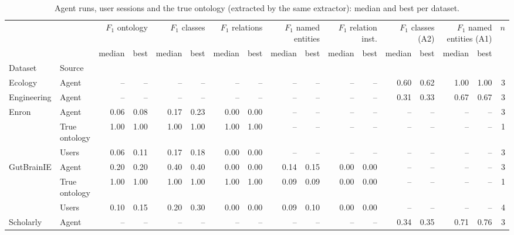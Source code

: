 \begin{table}
\caption{Agent runs, user sessions and the true ontology (extracted by the same extractor): median and best per dataset.}
\label{tab:onto_overview}
\begin{tabular}{llrrrrrrrrrrrrrrr}
\toprule
 &  & \multicolumn{2}{r}{$F_{1}$ ontology} & \multicolumn{2}{r}{$F_{1}$ classes} & \multicolumn{2}{r}{$F_{1}$ relations} & \multicolumn{2}{r}{$F_{1}$ named entities} & \multicolumn{2}{r}{$F_{1}$ relation inst.} & \multicolumn{2}{r}{$F_{1}$ classes (A2)} & \multicolumn{2}{r}{$F_{1}$ named entities (A1)} & $n$ \\
 &  & median & best & median & best & median & best & median & best & median & best & median & best & median & best &  \\
Dataset & Source &  &  &  &  &  &  &  &  &  &  &  &  &  &  &  \\
\midrule
Ecology & Agent & -- & -- & -- & -- & -- & -- & -- & -- & -- & -- & 0.60 & 0.62 & 1.00 & 1.00 & 3 \\
\cline{1-17}
Engineering & Agent & -- & -- & -- & -- & -- & -- & -- & -- & -- & -- & 0.31 & 0.33 & 0.67 & 0.67 & 3 \\
\cline{1-17}
\multirow[t]{3}{*}{Enron} & Agent & 0.06 & 0.08 & 0.17 & 0.23 & 0.00 & 0.00 & -- & -- & -- & -- & -- & -- & -- & -- & 3 \\
 & True ontology & 1.00 & 1.00 & 1.00 & 1.00 & 1.00 & 1.00 & -- & -- & -- & -- & -- & -- & -- & -- & 1 \\
 & Users & 0.06 & 0.11 & 0.17 & 0.18 & 0.00 & 0.00 & -- & -- & -- & -- & -- & -- & -- & -- & 3 \\
\cline{1-17}
\multirow[t]{3}{*}{GutBrainIE} & Agent & 0.20 & 0.20 & 0.40 & 0.40 & 0.00 & 0.00 & 0.14 & 0.15 & 0.00 & 0.00 & -- & -- & -- & -- & 3 \\
 & True ontology & 1.00 & 1.00 & 1.00 & 1.00 & 1.00 & 1.00 & 0.09 & 0.09 & 0.00 & 0.00 & -- & -- & -- & -- & 1 \\
 & Users & 0.10 & 0.15 & 0.20 & 0.30 & 0.00 & 0.00 & 0.09 & 0.10 & 0.00 & 0.00 & -- & -- & -- & -- & 4 \\
\cline{1-17}
Scholarly & Agent & -- & -- & -- & -- & -- & -- & -- & -- & -- & -- & 0.34 & 0.35 & 0.71 & 0.76 & 3 \\
\cline{1-17}
\bottomrule
\end{tabular}
\end{table}
